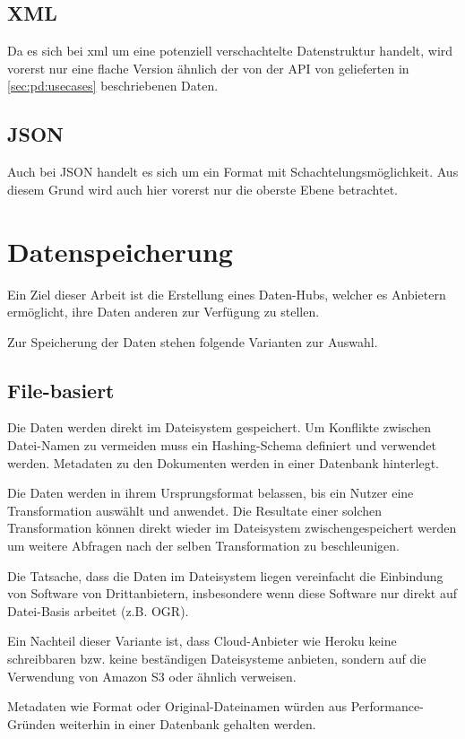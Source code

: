 \subsection{XML}
Da es sich bei \gls{xml} um eine potenziell verschachtelte Datenstruktur handelt, wird vorerst nur eine flache Version ähnlich der von der API von  gelieferten in \cref{sec:pd:usecases} beschriebenen Daten. 

\subsection{JSON}
Auch bei JSON handelt es sich um ein Format mit Schachtelungsmöglichkeit. Aus diesem Grund wird auch hier vorerst nur die oberste Ebene betrachtet.


\section{Datenspeicherung}
Ein Ziel dieser Arbeit ist die Erstellung eines Daten-Hubs, welcher es Anbietern ermöglicht, ihre Daten anderen zur Verfügung zu stellen. 

Zur Speicherung der Daten stehen folgende Varianten zur Auswahl.

\subsection{File-basiert}
Die Daten werden direkt im Dateisystem gespeichert. Um Konflikte zwischen Datei-Namen zu vermeiden muss ein Hashing-Schema definiert und verwendet werden. Metadaten zu den Dokumenten werden in einer Datenbank hinterlegt.

Die Daten werden in ihrem Ursprungsformat belassen, bis ein Nutzer eine Transformation auswählt und anwendet. Die Resultate einer solchen Transformation können direkt wieder im Dateisystem zwischengespeichert werden um weitere Abfragen nach der selben Transformation zu beschleunigen.

Die Tatsache, dass die Daten im Dateisystem liegen vereinfacht die Einbindung von Software von Drittanbietern, insbesondere wenn diese Software nur direkt auf Datei-Basis arbeitet (z.B. OGR).

Ein Nachteil dieser Variante ist, dass Cloud-Anbieter wie Heroku keine schreibbaren\cite{herokuReadOnlyFilesystem} bzw. keine beständigen\cite{herokuEphemeralFilesystem} Dateisysteme anbieten, sondern auf die Verwendung von Amazon S3 oder ähnlich verweisen.

Metadaten wie Format oder Original-Dateinamen würden aus Performance-Gründen weiterhin in einer Datenbank gehalten werden.

